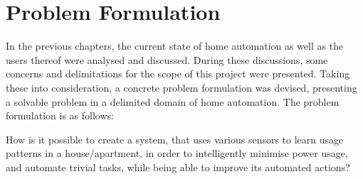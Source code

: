 \section{Problem Formulation}
In the previous chapters, the current state of home automation as well as the users thereof were analysed and discussed. During these discussions, some concerns and delimitations for the scope of this project were presented. Taking these into consideration, a concrete problem formulation was devised, presenting a solvable problem in a delimited domain of home automation. The problem formulation is as follows:

How is it possible to create a system, that uses various sensors to learn usage patterns in a house/apartment, in order to intelligently minimise power usage, and automate trivial tasks, while being able to improve its automated actions?


